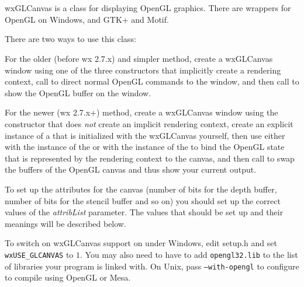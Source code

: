 \section{}\label{wxglcanvas}

wxGLCanvas is a class for displaying OpenGL graphics. There are
wrappers for OpenGL on Windows, and GTK+ and Motif.

There are two ways to use this class:

For the older (before wx 2.7.x) and simpler method, create a wxGLCanvas window using one of the three
constructors that implicitly create a rendering context, call  
to direct normal OpenGL commands to the window, and then call  
to show the OpenGL buffer on the window.

For the newer (wx 2.7.x+) method, create a wxGLCanvas window using the constructor that does \emph{not} create an implicit rendering context,
create an explicit instance of a  that is initialized with the wxGLCanvas yourself,
then use either  with the instance of the 
or  with the instance of the 
to bind the OpenGL state that is represented by the rendering context to the canvas, and then call
 to swap the buffers of the OpenGL canvas and thus show your current output.

To set up the attributes for the canvas (number of bits for the depth buffer,
number of bits for the stencil buffer and so on) you should set up the correct values of
the {\it attribList} parameter. The values that should be set up and their meanings will be described below.

To switch on wxGLCanvas support on under Windows, edit setup.h and set
{\tt wxUSE\_GLCANVAS} to $1$. You may also need to have to add
{\tt opengl32.lib} to the list of libraries your program is linked with. On
Unix, pass {\tt --with-opengl} to configure to compile using OpenGL or Mesa.


\\
\\

